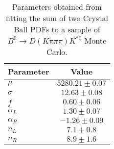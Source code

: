 \begin{table}[h]
  \centering
  \begin{tabular}{lc}
      \toprule
      Parameter & Value \\
      \midrule
      $\mu$ & $5280.21 \pm 0.07$ \\
      $\sigma$ & $12.63 \pm 0.08$ \\
      $f$ & $0.60 \pm 0.06$ \\
      $\alpha_L$ & $1.30 \pm 0.07$ \\
      $\alpha_R$ & $-1.26 \pm 0.09$ \\
      $n_L$ & $7.1 \pm 0.8$ \\
      $n_R$ & $8.9 \pm 1.6$ \\
  \bottomrule
  \end{tabular}
  \caption{Parameters obtained from fitting the sum of two Crystal Ball PDFs to a sample of $B^0 \to D(K\pi\pi\pi)K^{*0}$ Monte Carlo.}
\label{tab:signal_Kpipipi_MC_params}
\end{table}
